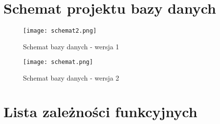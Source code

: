 \documentclass{article}
\theoremstyle{definition}
\begin{document}
	\section{Schemat projektu bazy danych}
		\begin{figure}[H]    
		\centering
		\texttt{[image: schemat2.png]} 
		\caption{Schemat bazy danych - wersja 1}
	\end{figure}
	
	\begin{figure}[H]    
		\centering
		\texttt{[image: schemat.png]} 
		\caption{Schemat bazy danych - wersja 2}
	\end{figure}
	
	
	\section{Lista zależności funkcyjnych}
\end{document}
